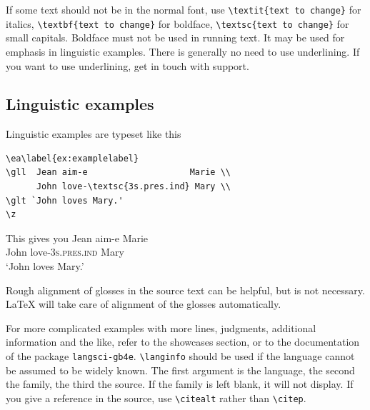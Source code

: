 If some text should not be in the normal font, use 
\verb+\textit{text to change}+ for italics, 
\verb+\textbf{text to change}+ for boldface, 
\verb+\textsc{text to change}+ for small capitals. Boldface must not be used in running text. It may be used for emphasis in linguistic examples. 
There is generally no need to use underlining. If you want to use underlining, get in touch with support.

\subsection{Linguistic examples}
Linguistic examples are typeset like this

\begin{verbatim}
\ea\label{ex:examplelabel} 
\gll  Jean aim-e                    Marie \\
      John love-\textsc{3s.pres.ind} Mary \\
\glt `John loves Mary.'    
\z
\end{verbatim}

\newcommand{\sg}{\textsc{sg}}
\newcommand{\prs}{\textsc{prs}}
\newcommand{\ind}{\textsc{ind}}
This gives you
\ea\label{ex:examplelabel} 
\gll  Jean aim-e Marie \\
      John love-\textsc{3s.pres.ind}  Mary \\
\glt `John loves Mary.'    
\z

Rough alignment of glosses in the source text can be helpful, but is not necessary. \LaTeX\xspace will take care of alignment of the glosses automatically. 
% 

For more complicated examples with more lines, judgments, additional information and the like, refer to the showcases section, or to the documentation of the package \verb+langsci-gb4e+.
\verb+\langinfo+ should be used if the language cannot be assumed to be widely known. The first argument is the language, the second the family, the third the source. If the family is left blank, it will not display. If you give a reference in the source, use \verb+\citealt+ rather than \verb+\citep+.

